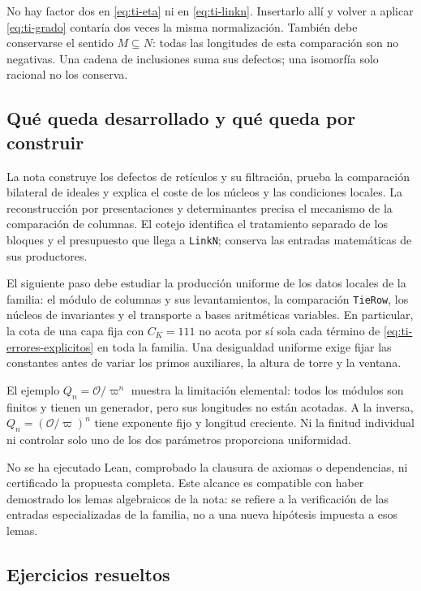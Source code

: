 No hay factor dos en \eqref{eq:ti-eta} ni en
\eqref{eq:ti-linkn}. Insertarlo allí y volver a aplicar
\eqref{eq:ti-grado} contaría dos veces la misma normalización.
También debe conservarse el sentido $M\subseteq N$: todas
las longitudes de esta comparación son no negativas.
Una cadena de inclusiones suma sus defectos; una isomorfía
solo racional no los conserva.

\subsection{Qué queda desarrollado y qué queda por construir}

La nota construye los defectos de retículos y su filtración,
prueba la comparación bilateral de ideales y explica el coste
de los núcleos y las condiciones locales. La reconstrucción
por presentaciones y determinantes precisa el mecanismo de la
comparación de columnas. El cotejo identifica el tratamiento
separado de los bloques y el presupuesto que llega a
\texttt{LinkN}; conserva las entradas matemáticas de sus
productores.

El siguiente paso debe estudiar la producción uniforme de los
datos locales de la familia: el módulo de columnas y sus
levantamientos, la comparación \texttt{TieRow}, los núcleos
de invariantes y el transporte a bases aritméticas variables.
En particular, la cota de una capa fija con $C_K=111$ no
acota por sí sola cada término de
\eqref{eq:ti-errores-explicitos} en toda la familia.
Una desigualdad uniforme exige fijar las constantes antes de
variar los primos auxiliares, la altura de torre y la ventana.

El ejemplo $Q_n=\mathcal O/\varpi^n$ muestra la limitación
elemental: todos los módulos son finitos y tienen un generador,
pero sus longitudes no están acotadas. A la inversa,
$Q_n=(\mathcal O/\varpi)^n$ tiene exponente fijo y longitud
creciente. Ni la finitud individual ni controlar solo uno
de los dos parámetros proporciona uniformidad.

No se ha ejecutado Lean, comprobado la clausura de axiomas o
dependencias, ni certificado la propuesta completa. Este alcance
es compatible con haber demostrado los lemas algebraicos de la
nota: se refiere a la verificación de las entradas especializadas
de la familia, no a una nueva hipótesis impuesta a esos lemas.

\subsection{Ejercicios resueltos}

